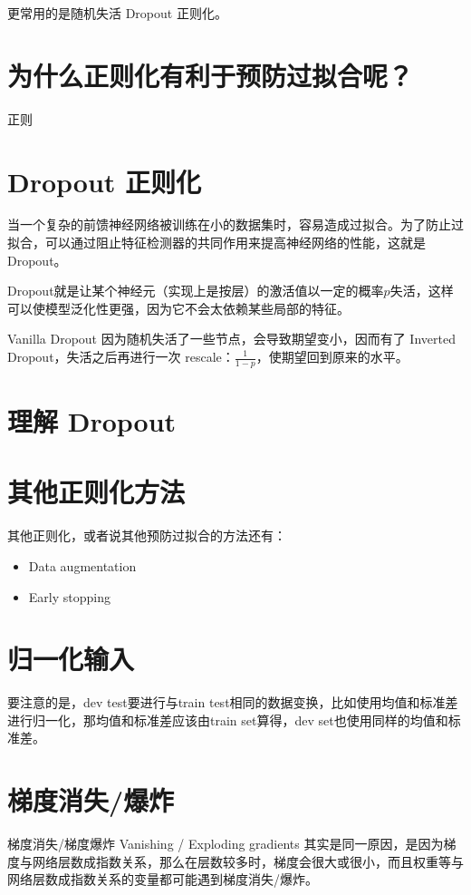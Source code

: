 \documentclass[../../main.tex]{subfiles}
\begin{document}
更常用的是随机失活 Dropout 正则化。

\section{为什么正则化有利于预防过拟合呢？}
正则
\section{Dropout 正则化}
当一个复杂的前馈神经网络被训练在小的数据集时，容易造成过拟合。为了防止过拟合，可以通过阻止特征检测器的共同作用来提高神经网络的性能，这就是 Dropout。

Dropout就是让某个神经元（实现上是按层）的激活值以一定的概率\(p\)失活，这样可以使模型泛化性更强，因为它不会太依赖某些局部的特征。

Vanilla Dropout 因为随机失活了一些节点，会导致期望变小，因而有了 Inverted Dropout，失活之后再进行一次 rescale：\(\frac{1}{1-p}\)，使期望回到原来的水平。

\section{理解 Dropout}

\section{其他正则化方法}
其他正则化，或者说其他预防过拟合的方法还有：
\begin{itemize}
    \item Data augmentation
    \item Early stopping
\end{itemize}

\section{归一化输入}
要注意的是，dev test要进行与train test相同的数据变换，比如使用均值和标准差进行归一化，那均值和标准差应该由train set算得，dev set也使用同样的均值和标准差。

\section{梯度消失/爆炸}
梯度消失/梯度爆炸 Vanishing / Exploding gradients 其实是同一原因，是因为梯度与网络层数成指数关系，那么在层数较多时，梯度会很大或很小，而且权重等与网络层数成指数关系的变量都可能遇到梯度消失/爆炸。
\end{document}
